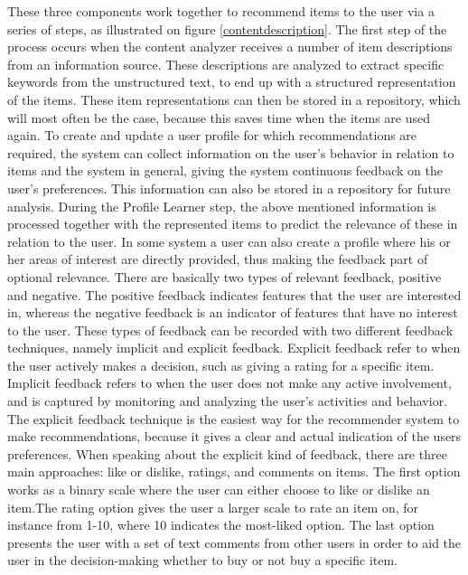 These three components work together to recommend items to the user via a series of steps, as illustrated on figure \ref{contentdescription}.\newline 
The first step of the process occurs when the content analyzer receives a number of item descriptions from an information source. These descriptions are analyzed to extract specific keywords from the unstructured text, to end up with a structured representation of the items. These item representations can then be stored in a repository, which will most often be the case, because this saves time when the items are used again. To create and update a user profile for which recommendations are required, the system can collect information on the user's behavior in relation to items and the system in general, giving the system continuous feedback on the user's preferences. This information can also be stored in a repository for future analysis.\newline
During the Profile Learner step, the above mentioned information is processed together with the represented items to predict the relevance of these in relation to the user. In some system a user can also create a profile where his or her areas of interest are directly provided, thus making the feedback part of optional relevance.\newline
There are basically two types of relevant feedback, positive and negative. The positive feedback indicates features that the user are interested in, whereas the negative feedback is an indicator of features that have no interest to the user. \newline
These types of feedback can be recorded with two different feedback techniques, namely implicit and explicit feedback. Explicit feedback refer to when the user actively makes a decision, such as giving a rating for a specific item. Implicit feedback refers to when the user does not make any active involvement, and is captured by monitoring and analyzing the user's activities and behavior.\newline
The explicit feedback technique is the easiest way for the recommender system to make recommendations, because it gives a clear and actual indication of the users preferences. When speaking about the explicit kind of feedback, there are three main approaches: like or dislike, ratings, and comments on items.\newline
The first option works as a binary scale where the user can either choose to like or dislike an item.The rating option gives the user a larger scale to rate an item on, for instance from 1-10, where 10 indicates the most-liked option. The last option presents the user with a set of text comments from other users in order to aid the user in the decision-making whether to buy or not buy a specific item.\newline

